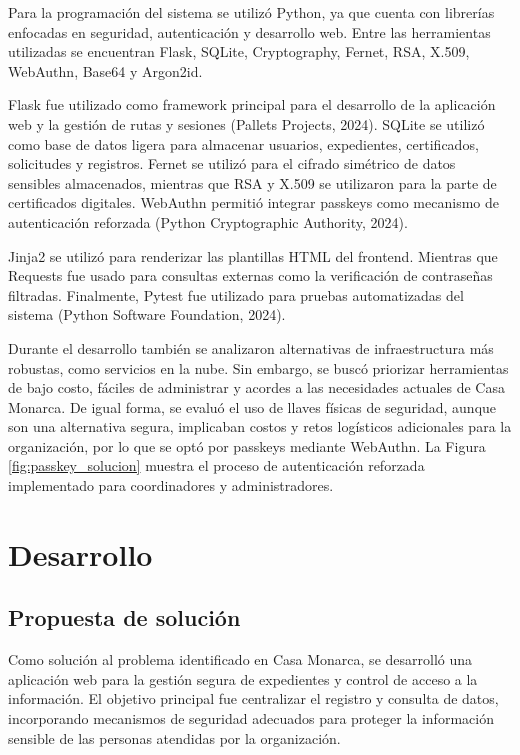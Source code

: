 \documentclass[10pt, letterpaper]{article}
\begin{document}
Para la programación del sistema se utilizó Python, ya que cuenta con librerías enfocadas en seguridad, autenticación y desarrollo web. Entre las herramientas utilizadas se encuentran Flask, SQLite, Cryptography, Fernet, RSA, X.509, WebAuthn, Base64 y Argon2id.

Flask fue utilizado como framework principal para el desarrollo de la aplicación web y la gestión de rutas y sesiones (Pallets Projects, 2024). SQLite se utilizó como base de datos ligera para almacenar usuarios, expedientes, certificados, solicitudes y registros. Fernet se utilizó para el cifrado simétrico de datos sensibles almacenados, mientras que RSA y X.509 se utilizaron para la parte de certificados digitales. WebAuthn permitió integrar passkeys como mecanismo de autenticación reforzada (Python Cryptographic Authority, 2024).

Jinja2 se utilizó para renderizar las plantillas HTML del frontend. Mientras que Requests fue usado para consultas externas como la verificación de contraseñas filtradas. Finalmente, Pytest fue utilizado para pruebas automatizadas del sistema (Python Software Foundation, 2024).

Durante el desarrollo también se analizaron alternativas de infraestructura más robustas, como servicios en la nube. Sin embargo, se buscó priorizar herramientas de bajo costo, fáciles de administrar y acordes a las necesidades actuales de Casa Monarca. De igual forma, se evaluó el uso de llaves físicas de seguridad, aunque son una alternativa segura, implicaban costos y retos logísticos adicionales para la organización, por lo que se optó por passkeys mediante WebAuthn. La Figura \ref{fig:passkey_solucion} muestra el proceso de autenticación reforzada implementado para coordinadores y administradores.

\section{Desarrollo}

\subsection{Propuesta de solución}

Como solución al problema identificado en Casa Monarca, se desarrolló una aplicación web para la gestión segura de expedientes y control de acceso a la información. El objetivo principal fue centralizar el registro y consulta de datos, incorporando mecanismos de seguridad adecuados para proteger la información sensible de las personas atendidas por la organización.
\end{document}
